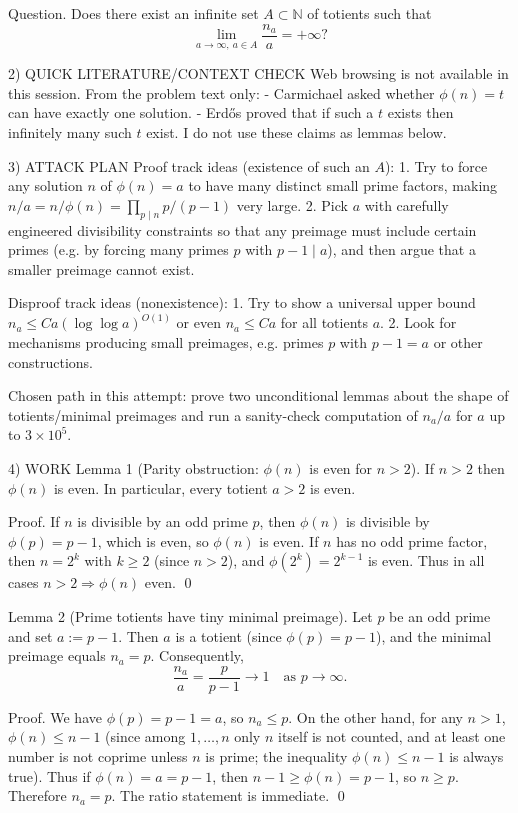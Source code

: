 Question.
Does there exist an infinite set $A\subset\mathbb N$ of totients such that
\[\lim_{a\to\infty,\ a\in A}\frac{n_a}{a}=+\infty?\]

2) QUICK LITERATURE/CONTEXT CHECK
Web browsing is not available in this session.
From the problem text only:
- Carmichael asked whether $\phi(n)=t$ can have exactly one solution.
- Erd\H{o}s proved that if such a $t$ exists then infinitely many such $t$ exist.
I do not use these claims as lemmas below.

3) ATTACK PLAN
Proof track ideas (existence of such an $A$):
1. Try to force any solution $n$ of $\phi(n)=a$ to have many distinct small prime factors, making $n/a=n/\phi(n)=\prod_{p\mid n}p/(p-1)$ very large.
2. Pick $a$ with carefully engineered divisibility constraints so that any preimage must include certain primes (e.g. by forcing many primes $p$ with $p-1\mid a$),
   and then argue that a smaller preimage cannot exist.

Disproof track ideas (nonexistence):
1. Try to show a universal upper bound $n_a \le C a (\log\log a)^{O(1)}$ or even $n_a\le Ca$ for all totients $a$.
2. Look for mechanisms producing small preimages, e.g. primes $p$ with $p-1=a$ or other constructions.

Chosen path in this attempt: prove two unconditional lemmas about the shape of totients/minimal preimages and run a sanity-check computation of $n_a/a$ for $a$ up to $3\times 10^5$.

4) WORK
Lemma 1 (Parity obstruction: $\phi(n)$ is even for $n>2$).
If $n>2$ then $\phi(n)$ is even. In particular, every totient $a>2$ is even.

Proof.
If $n$ is divisible by an odd prime $p$, then $\phi(n)$ is divisible by $\phi(p)=p-1$, which is even, so $\phi(n)$ is even.
If $n$ has no odd prime factor, then $n=2^k$ with $k\ge 2$ (since $n>2$), and $\phi(2^k)=2^{k-1}$ is even.
Thus in all cases $n>2\Rightarrow \phi(n)$ even. \qed

Lemma 2 (Prime totients have tiny minimal preimage).
Let $p$ be an odd prime and set $a:=p-1$. Then $a$ is a totient (since $\phi(p)=p-1$), and the minimal preimage equals $n_a=p$.
Consequently,
\[\frac{n_a}{a}=\frac{p}{p-1}\to 1\quad\text{as }p\to\infty.\]

Proof.
We have $\phi(p)=p-1=a$, so $n_a\le p$.
On the other hand, for any $n>1$, $\phi(n)\le n-1$ (since among $1,\dots,n$ only $n$ itself is not counted, and at least one number is not coprime unless $n$ is prime; the inequality $\phi(n)\le n-1$ is always true).
Thus if $\phi(n)=a=p-1$, then $n-1\ge \phi(n)=p-1$, so $n\ge p$.
Therefore $n_a=p$. The ratio statement is immediate. \qed


